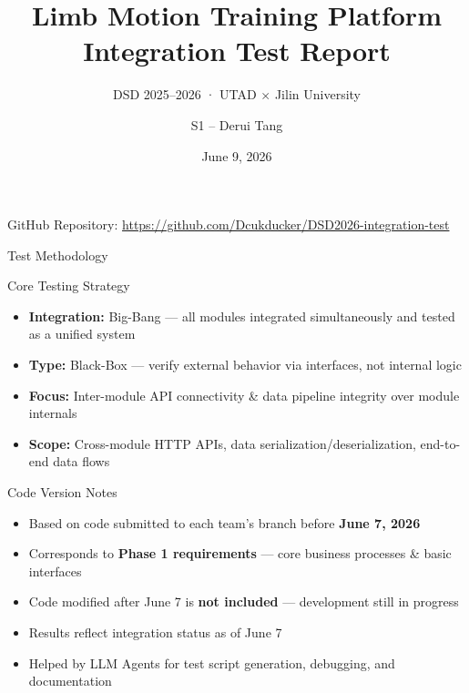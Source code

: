 \documentclass[aspectratio=169,utf8,11pt]{beamer}
\title[DSD 2026 Integration Test]{Limb Motion Training Platform\\\normalsize Integration Test Report}
\subtitle{DSD 2025--2026 · UTAD $\times$ Jilin University}
\author{S1 -- Derui Tang}
\institute{4-Module Collaborative Integration Verification}
\date{June 9, 2026}
\begin{document}
\begin{frame}[plain]
  \titlepage
  \begin{center}

    \vspace{0.8cm}
    {\footnotesize GitHub Repository: \textcolor{blue}{\url{https://github.com/Dcukducker/DSD2026-integration-test}}}
  \end{center}
\end{frame}

\begin{frame}{Test Methodology}
  \begin{alertblock}{Core Testing Strategy}
    \small
    \begin{itemize}
      \item \textbf{Integration:} Big-Bang — all modules integrated simultaneously and tested as a unified system
      \item \textbf{Type:} Black-Box — verify external behavior via interfaces, not internal logic
      \item \textbf{Focus:} Inter-module API connectivity \& data pipeline integrity over module internals
      \item \textbf{Scope:} Cross-module HTTP APIs, data serialization/deserialization, end-to-end data flows
    \end{itemize}
  \end{alertblock}

  \vspace{0.15cm}
  \begin{block}{Code Version Notes}
    \small
    \begin{itemize}
      \item Based on code submitted to each team's branch before \textbf{June 7, 2026}
      \item Corresponds to \textbf{Phase 1 requirements} — core business processes \& basic interfaces
      \item Code modified after June 7 is \textbf{not included} — development still in progress
      \item Results reflect integration status as of June 7
      \item Helped by LLM Agents for test script generation, debugging, and documentation
    \end{itemize}
    \vspace{0.15cm}
  \end{block}
\end{frame}
\end{document}
